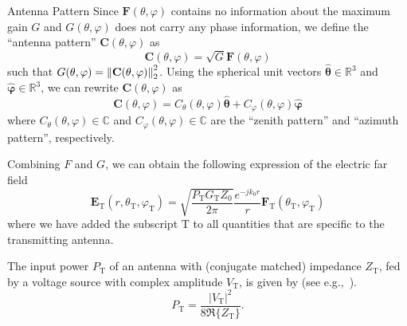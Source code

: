 \begin{highlightbox}{Antenna Pattern}
    Since $\mathbf{F}(\theta, \varphi)$ contains no information about the maximum gain $G$ and $G(\theta, \varphi)$ does not carry any phase information, we define the ``antenna pattern'' $\mathbf{C}(\theta, \varphi)$ as
    \begin{equation}
        \label{eq:C}
        \mathbf{C}(\theta, \varphi) = \sqrt{G}\mathbf{F}(\theta, \varphi)
    \end{equation}
    such that $G(\theta, \varphi)= \left\lVert\mathbf{C}(\theta, \varphi)\right\rVert_2^2$.
%
    Using the spherical unit vectors $\hat{\boldsymbol{\theta}}\in\mathbb{R}^3$ and $\hat{\boldsymbol{\varphi}}\in\mathbb{R}^3$, we can rewrite $\mathbf{C}(\theta, \varphi)$ as
    \begin{equation}
        \mathbf{C}(\theta, \varphi) = C_\theta(\theta,\varphi) \hat{\boldsymbol{\theta}} + C_\varphi(\theta,\varphi) \hat{\boldsymbol{\varphi}}
    \end{equation}
    where $C_\theta(\theta,\varphi)\in\mathbb{C}$ and $C_\varphi(\theta,\varphi)\in\mathbb{C}$ are the ``zenith pattern'' and ``azimuth pattern'', respectively.
\end{highlightbox}

Combining $F$ and $G$, we can obtain the following expression of the electric far field
\begin{equation}
    \label{eq:E_T}
    \mathbf{E}_\text{T}(r,\theta_\text{T},\varphi_\text{T}) = \sqrt{ \frac{P_\text{T} G_\text{T} Z_0}{2\pi}} \frac{e^{-jk_0 r}}{r} \mathbf{F}_\text{T}(\theta_\text{T}, \varphi_\text{T})
\end{equation}
where we have added the subscript $\text{T}$ to all quantities that are specific to the transmitting antenna.

The input power $P_\text{T}$ of an antenna with (conjugate matched) impedance $Z_\text{T}$, fed by a voltage source with complex amplitude $V_\text{T}$, is given by (see e.g.,~\cite{Wikipedia_power}).
\begin{equation}
    \label{eq:P_T}
    P_\text{T} = \frac{|V_\text{T}|^2}{8\Re\{Z_\text{T}\}}.
\end{equation}

